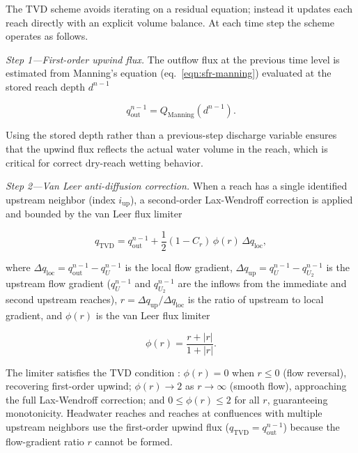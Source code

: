 The TVD scheme avoids iterating on a residual equation; instead it updates each reach directly with an explicit volume balance. At each time step the scheme operates as follows.

\textit{Step 1---First-order upwind flux.}
The outflow flux at the previous time level is estimated from Manning's equation (eq.~\ref{eqn:sfr-manning}) evaluated at the stored reach depth $d^{n-1}$

\begin{equation}
  \label{eqn:sfr-tvd-upwind}
  q_\mathrm{out}^{n-1} = Q_\mathrm{Manning}\!\left(d^{n-1}\right) .
\end{equation}

\noindent Using the stored depth rather than a previous-step discharge variable ensures that the upwind flux reflects the actual water volume in the reach, which is critical for correct dry-reach wetting behavior.

\textit{Step 2---Van Leer anti-diffusion correction.}
When a reach has a single identified upstream neighbor (index $i_\mathrm{up}$), a second-order Lax-Wendroff correction is applied and bounded by the van Leer flux limiter \citep{vanLeer1974}

\begin{equation}
  \label{eqn:sfr-tvd-vanleer}
  q_\mathrm{TVD} = q_\mathrm{out}^{n-1}
    + \frac{1}{2}(1 - C_r)\,\phi(r)\,\Delta q_\mathrm{loc} ,
\end{equation}

\noindent where $\Delta q_\mathrm{loc} = q_\mathrm{out}^{n-1} - q_{U}^{n-1}$ is the local flow gradient, $\Delta q_\mathrm{up} = q_{U}^{n-1} - q_{U_2}^{n-1}$ is the upstream flow gradient ($q_{U}^{n-1}$ and $q_{U_2}^{n-1}$ are the inflows from the immediate and second upstream reaches), $r = \Delta q_\mathrm{up} / \Delta q_\mathrm{loc}$ is the ratio of upstream to local gradient, and $\phi(r)$ is the van Leer flux limiter

\begin{equation}
  \label{eqn:sfr-tvd-limiter}
  \phi(r) = \frac{r + |r|}{1 + |r|} .
\end{equation}

\noindent The limiter satisfies the TVD condition \citep{Sweby1984}: $\phi(r) = 0$ when $r \le 0$ (flow reversal), recovering first-order upwind; $\phi(r) \to 2$ as $r \to \infty$ (smooth flow), approaching the full Lax-Wendroff correction; and $0 \le \phi(r) \le 2$ for all $r$, guaranteeing monotonicity. Headwater reaches and reaches at confluences with multiple upstream neighbors use the first-order upwind flux ($q_\mathrm{TVD} = q_\mathrm{out}^{n-1}$) because the flow-gradient ratio $r$ cannot be formed.

